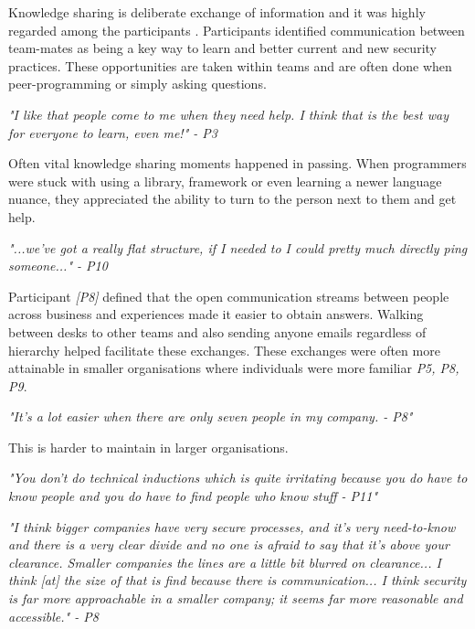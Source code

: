 Knowledge sharing is deliberate exchange of information and it was highly regarded among the participants \cite{know}. Participants identified communication between team-mates as being a key way to learn and better current and new security practices. These opportunities are taken within teams and are often done when peer-programming or simply asking questions. 
\newline
\par
\textit{"I like that people come to me when they need help. I think that is the best way for everyone to learn, even me!" - P3}
\newline
\par
Often vital knowledge sharing moments happened in passing. When programmers were stuck with using a library, framework or even learning a newer language nuance, they appreciated the ability to turn to the person next to them and get help. 
\newline
\par \textit{"...we've got a really flat structure, if I needed to I could pretty much directly ping someone..." - P10 }
\newline
\par
Participant \textit{[P8]} defined that the open communication streams between people across business and experiences made it easier to obtain answers. Walking between desks to other teams and also sending anyone emails regardless of hierarchy helped facilitate these exchanges. These exchanges were often more attainable in smaller organisations where individuals were more familiar \textit{{P5, P8, P9}}. 
\newline
\par 
\textit{"It's a lot easier when there are only seven people in my company. - P8"}
\newline
\par
This is harder to maintain in larger organisations. 
\newline
\par
\textit{"You don't do technical inductions which is quite irritating  because you do have to know people and you do have to  find people who know stuff - P11"}
\newline
\par
\textit{"I think bigger companies have very secure processes, and it's very need-to-know and there is a very clear divide and no one is afraid to say that it's above your clearance. Smaller companies the lines are a little bit blurred on clearance... I think [at] the size of that is find because there is communication... I think security is far more approachable in a smaller company; it seems far more reasonable and accessible." - P8}

